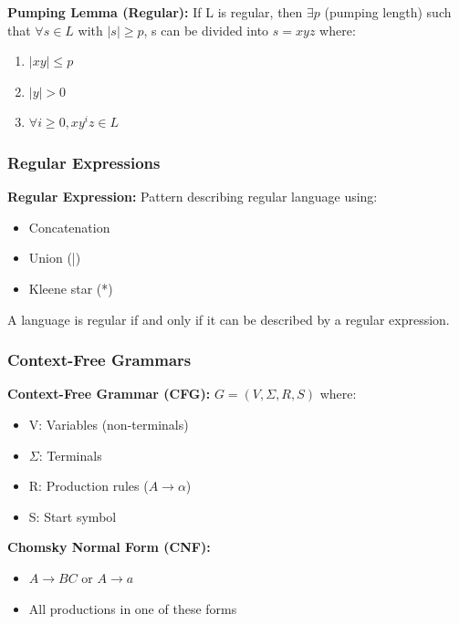 \documentclass[11pt,a4paper]{article}
\begin{document}
\begin{thmbox}
\textbf{Pumping Lemma (Regular):} If L is regular, then $\exists p$ (pumping length) such that $\forall s \in L$ with $|s| \geq p$, s can be divided into $s = xyz$ where:
\begin{enumerate}
    \item $|xy| \leq p$
    \item $|y| > 0$
    \item $\forall i \geq 0, xy^iz \in L$
\end{enumerate}
\end{thmbox}

\subsubsection{Regular Expressions}

\begin{defbox}
\textbf{Regular Expression:} Pattern describing regular language using:
\begin{itemize}
    \item Concatenation
    \item Union (|)
    \item Kleene star (*)
\end{itemize}
\end{defbox}

\begin{thmbox}
A language is regular if and only if it can be described by a regular expression.
\end{thmbox}

\subsubsection{Context-Free Grammars}

\begin{defbox}
\textbf{Context-Free Grammar (CFG):} $G = (V, \Sigma, R, S)$ where:
\begin{itemize}
    \item V: Variables (non-terminals)
    \item $\Sigma$: Terminals
    \item R: Production rules ($ A \rightarrow \alpha$)
    \item S: Start symbol
\end{itemize}
\end{defbox}

\textbf{Chomsky Normal Form (CNF):}
\begin{itemize}
    \item $A \rightarrow BC$ or $A \rightarrow a$
    \item All productions in one of these forms
\end{itemize}
\end{document}
